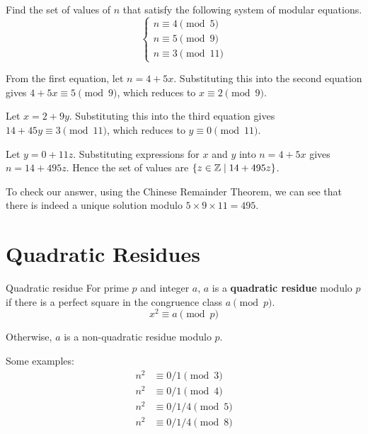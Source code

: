 \begin{exmp}{}{}
Find the set of values of $n$ that satisfy the following system of modular equations.
\[ \begin{cases}
n \equiv 4 \pmod 5 \\
n \equiv 5 \pmod 9 \\
n \equiv 3 \pmod {11}
\end{cases} \]
\end{exmp}
\begin{solution}
From the first equation, let $n=4+5x$. Substituting this into the second equation gives $4+5x \equiv 5 \pmod 9$, which reduces to $x \equiv 2 \pmod 9$.

Let $x=2+9y$. Substituting this into the third equation gives $14+45y \equiv 3 \pmod 11$, which reduces to $y \equiv 0 \pmod 11$. 

Let $y=0+11z$. Substituting expressions for $x$ and $y$ into $n=4+5x$ gives $n=14+495z$. Hence the set of values are $\{z\in\mathbb Z \mid 14+495z\}$.

\begin{remark}
To check our answer, using the Chinese Remainder Theorem, we can see that there is indeed a unique solution modulo $5 \times 9 \times 11 = 495$.
\end{remark}
\end{solution}
\pagebreak

\section{Quadratic Residues}
\begin{defn}{Quadratic residue}{}
For prime $p$ and integer $a$, $a$ is a \textbf{quadratic residue} modulo $p$ if there is a perfect square in the congruence class $a \pmod p$.
\[ x^2 \equiv a \pmod p \]

Otherwise, $a$ is a non-quadratic residue modulo $p$.
\end{defn}

Some examples:
\begin{align*}
n^2 &\equiv 0/1 \pmod 3 \\
n^2 &\equiv 0/1 \pmod 4 \\
n^2 &\equiv 0/1/4 \pmod 5 \\
n^2 &\equiv 0/1/4 \pmod 8
\end{align*}

